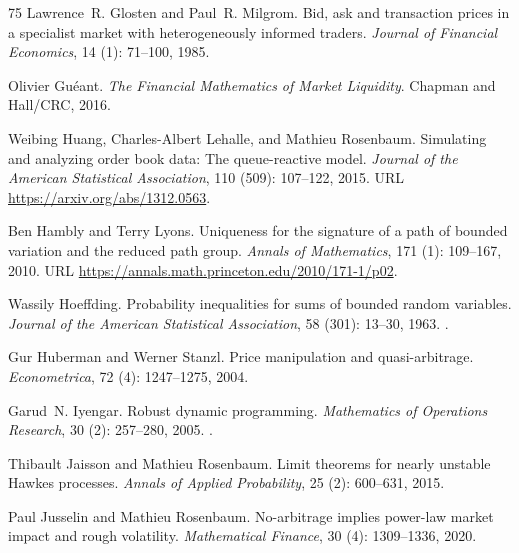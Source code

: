 \documentclass[11pt]{article}
\numberwithin{equation}{section}
\theoremstyle{definition}
\theoremstyle{remark}
\theoremstyle{definition}
\begin{document}
\begin{thebibliography}{75}
Lawrence~R. Glosten and Paul~R. Milgrom.
\newblock Bid, ask and transaction prices in a specialist market with
  heterogeneously informed traders.
\newblock \emph{Journal of Financial Economics}, 14 (1):
  71--100, 1985.

Olivier Gu{\'e}ant.
\newblock \emph{The Financial Mathematics of Market Liquidity}.
\newblock Chapman and Hall/CRC, 2016.

Weibing Huang, Charles-Albert Lehalle, and Mathieu Rosenbaum.
\newblock Simulating and analyzing order book data: The queue-reactive model.
\newblock \emph{Journal of the American Statistical Association}, 110
  (509): 107--122, 2015.
\newblock URL \url{https://arxiv.org/abs/1312.0563}.

Ben Hambly and Terry Lyons.
\newblock Uniqueness for the signature of a path of bounded variation and the
  reduced path group.
\newblock \emph{Annals of Mathematics}, 171 (1):
  109--167, 2010.
\newblock URL \url{https://annals.math.princeton.edu/2010/171-1/p02}.

Wassily Hoeffding.
\newblock Probability inequalities for sums of bounded random variables.
\newblock \emph{Journal of the American Statistical Association},
  58 (301): 13--30, 1963.
\newblock {}.

Gur Huberman and Werner Stanzl.
\newblock Price manipulation and quasi-arbitrage.
\newblock \emph{Econometrica}, 72 (4): 1247--1275, 2004.


Garud~N. Iyengar.
\newblock Robust dynamic programming.
\newblock \emph{Mathematics of Operations Research}, 30 (2):
  257--280, 2005.
\newblock {}.

Thibault Jaisson and Mathieu Rosenbaum.
\newblock Limit theorems for nearly unstable {H}awkes processes.
\newblock \emph{Annals of Applied Probability}, 25 (2):
  600--631, 2015.

Paul Jusselin and Mathieu Rosenbaum.
\newblock No-arbitrage implies power-law market impact and rough volatility.
\newblock \emph{Mathematical Finance}, 30 (4): 1309--1336,
  2020.


\end{thebibliography}
\end{document}
